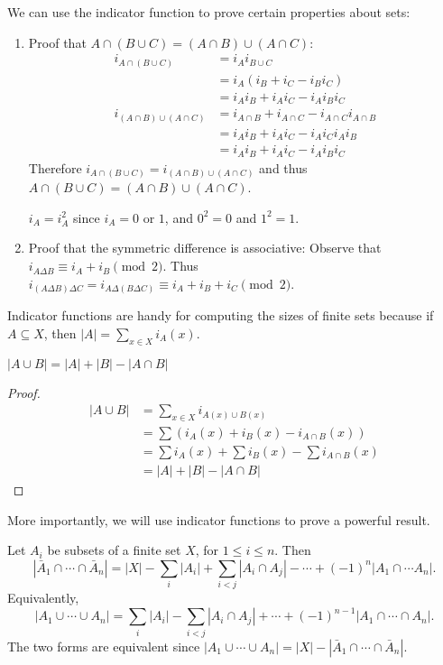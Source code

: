 \documentclass[a4paper]{article}
\begin{document}
\begin{eg}
  We can use the indicator function to prove certain properties about sets:
  \begin{enumerate}
    \item Proof that $A\cap(B\cup C) = (A\cap B)\cup (A\cap C)$:
      \begin{align*}
        i_{A\cap (B\cup C)} &= i_Ai_{B\cup C}\\
        &= i_A(i_B + i_C - i_Bi_C)\\
        &= i_Ai_B + i_Ai_C - i_Ai_Bi_C\\
        i_{(A\cap B)\cup (A\cap C)} &= i_{A\cap B} + i_{A\cap C} - i_{A\cap C}i_{A\cap B}\\
        &= i_Ai_B + i_Ai_C - i_Ai_Ci_Ai_B\\
        &= i_Ai_B + i_Ai_C - i_Ai_Bi_C
      \end{align*}
      Therefore $i_{A\cap (B\cup C)} = i_{(A\cap B)\cup (A\cap C)}$ and thus $A\cap(B\cup C) = (A\cap B)\cup (A\cap C)$.

      \note $i_A = i_A^2$ since $i_A = 0 $ or $1$, and $0^2 = 0$ and $1^2 = 1$.
    \item Proof that the symmetric difference is associative: Observe that $i_{A\Delta B} \equiv i_A + i_B \pmod 2$. Thus $i_{(A\Delta B)\Delta C} = i_{A\Delta(B\Delta C)} \equiv i_A + i_B + i_C \pmod2$.
  \end{enumerate}
\end{eg}
Indicator functions are handy for computing the sizes of finite sets because if $A\subseteq X$, then $|A| = \sum\limits_{x\in X}i_A(x)$.

\begin{prop}
  $|A\cup B| = |A| + |B| - |A\cap B|$
\end{prop}

\begin{proof}
  \begin{align*}
    |A\cup B| &= \sum_{x\in X} i_{A(x)\cup B(x)}\\
    &= \sum (i_A(x) + i_B(x) - i_{A\cap B}(x))\\
    &= \sum i_A(x) + \sum i_B(x) - \sum i_{A\cap B}(x)\\
    &= |A| + |B| - |A\cap B|
  \end{align*}
\end{proof}

More importantly, we will use indicator functions to prove a powerful result.
\begin{thm}
  Let $A_i$ be subsets of a finite set $X$, for $1 \leq i\leq n$. Then
  \[
    |\bar A_1\cap \cdots \cap \bar A_n| = |X| - \sum_i |A_i| + \sum_{i < j}|A_i\cap A_j| -  \cdots + (-1)^n|A_1\cap \cdots A_n|.
  \]
  Equivalently,
  \[
    |A_1\cup \cdots \cup A_n| = \sum_i|A_i| - \sum_{i < j}|A_i\cap A_j| + \cdots +(-1)^{n-1}|A_1\cap \cdots \cap A_n|.
  \]
  The two forms are equivalent since $|A_1\cup\cdots\cup A_n| = |X| - |\bar A_1\cap \cdots \cap \bar A_n|$.
\end{thm}
\end{document}
